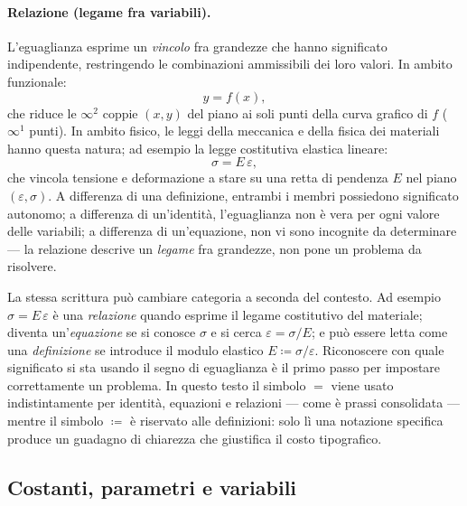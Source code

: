 \paragraph{Relazione (legame fra variabili).}
L'eguaglianza esprime un \textit{vincolo} fra grandezze che hanno
significato indipendente, restringendo le combinazioni ammissibili
dei loro valori. In ambito funzionale:
\begin{equation}
	y = f(x),
\end{equation}
che riduce le $\infty^2$ coppie $(x,y)$ del piano ai soli punti
della curva grafico di $f$ ($\infty^1$ punti). In ambito fisico,
le leggi della meccanica e della fisica dei materiali hanno questa
natura; ad esempio la legge costitutiva elastica lineare:
\begin{equation}
	\sigma = E\,\varepsilon,
\end{equation}
che vincola tensione e deformazione a stare su una retta di
pendenza $E$ nel piano $(\varepsilon,\sigma)$. A differenza di
una definizione, entrambi i membri possiedono significato
autonomo; a differenza di un'identit\`a, l'eguaglianza non \`e
vera per ogni valore delle variabili; a differenza di
un'equazione, non vi sono incognite da determinare --- la
relazione descrive un \textit{legame} fra grandezze, non pone un
problema da risolvere.


\begin{oss}
	La stessa scrittura può cambiare categoria a seconda del
	contesto. Ad esempio $\sigma = E\,\varepsilon$ è una
	\textit{relazione} quando esprime il legame costitutivo del
	materiale; diventa un'\textit{equazione} se si conosce $\sigma$
	e si cerca $\varepsilon = \sigma/E$; e può essere letta come
	una \textit{definizione} se introduce il modulo elastico
	$E \coloneqq \sigma/\varepsilon$. Riconoscere con quale
	significato si sta usando il segno di eguaglianza è il primo
	passo per impostare correttamente un problema. In questo testo 
	il simbolo $=$ viene usato indistintamente per identità, 
	equazioni e relazioni --- come è prassi consolidata --- mentre 
	il simbolo $\coloneqq$ è riservato alle definizioni: solo lì 
	una notazione specifica produce un guadagno di chiarezza che 
	giustifica il costo tipografico.
\end{oss}

\subsection{Costanti, parametri e variabili}\label{sec:costanti_parametri}

